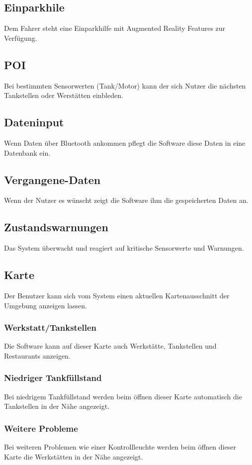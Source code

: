 \documentclass[pflichtenheft.tex]{subfiles}
\begin{document}
\subsection{\mkfa Einparkhile} Dem Fahrer steht eine Einparkhilfe mit Augmented Reality Features zur Verfügung.

\subsection{\mkfa POI} Bei bestimmten Sensorwerten (Tank/Motor) kann der sich Nutzer die nächsten Tankstellen oder Werstätten einbleden.

\subsection{\mkfa Dateninput}
Wenn Daten über Bluetooth ankommen pflegt die Software diese Daten in eine Datenbank ein. 
\subsection{\mkfa Vergangene-Daten}
Wenn der Nutzer es wünscht zeigt die Software ihm die gespeicherten Daten an.
\subsection{\mkfa Zustandswarnungen}
Das System überwacht und reagiert auf kritische Sensorwerte und Warnungen.

\subsection{\mkfa Karte}
Der Benutzer kann sich vom System einen aktuellen Kartenausschnitt der Umgebung anzeigen lassen.
\subsubsection{\mkfa Werkstatt/Tankstellen}
Die Software kann auf dieser Karte auch Werkstätte, Tankstellen und Restaurants anzeigen.
\subsubsection{\mkfa Niedriger Tankfüllstand}
Bei niedrigem Tankfüllstand werden beim öffnen dieser Karte automatisch die Tankstellen in der Nähe angezeigt.
\subsubsection{\mkfa Weitere Probleme} %
Bei weiteren Problemen wie einer Kontrollleuchte werden beim öffnen dieser Karte die Werkstätten in der Nähe angezeigt.
\end{document}
